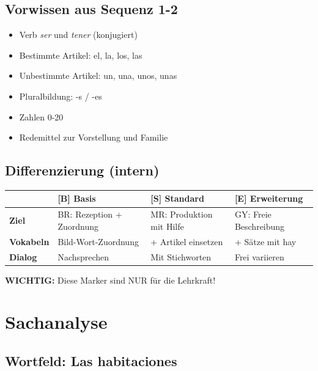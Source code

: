 \documentclass[11pt,a4paper]{article}
\newcommand{\B}{\textcolor{basis}{\textbf{[B]}}}
\newcommand{\Std}{\textcolor{standard}{\textbf{[S]}}}
\newcommand{\E}{\textcolor{erweiterung}{\textbf{[E]}}}
\begin{document}
\subsection{Vorwissen aus Sequenz 1-2}
\begin{itemize}
    \item Verb \textit{ser} und \textit{tener} (konjugiert)
    \item Bestimmte Artikel: el, la, los, las
    \item Unbestimmte Artikel: un, una, unos, unas
    \item Pluralbildung: -s / -es
    \item Zahlen 0-20
    \item Redemittel zur Vorstellung und Familie
\end{itemize}

\subsection{Differenzierung (intern)}
\begin{tabular}{|l|p{3.5cm}|p{3.5cm}|p{3.5cm}|}
\hline
& \B{} \textbf{Basis} & \Std{} \textbf{Standard} & \E{} \textbf{Erweiterung} \\
\hline
\textbf{Ziel} & BR: Rezeption + Zuordnung & MR: Produktion mit Hilfe & GY: Freie Beschreibung \\
\hline
\textbf{Vokabeln} & Bild-Wort-Zuordnung & + Artikel einsetzen & + Sätze mit hay \\
\hline
\textbf{Dialog} & Nachsprechen & Mit Stichworten & Frei variieren \\
\hline
\end{tabular}

\vspace{0.5em}
\textbf{WICHTIG:} Diese Marker sind NUR für die Lehrkraft!

\section{Sachanalyse}

\subsection{Wortfeld: Las habitaciones}
\end{document}
